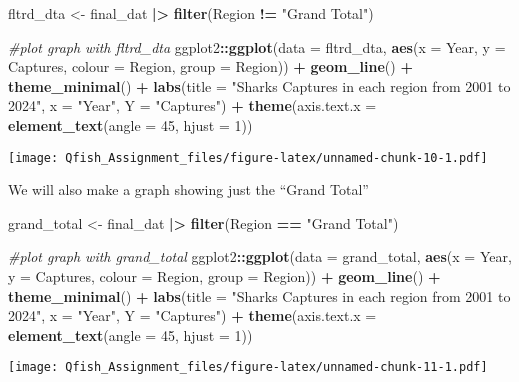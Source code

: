 \documentclass[
]{article}
\newenvironment{Shaded}{\begin{snugshade}}{\end{snugshade}}
\newcommand{\AttributeTok}[1]{\textcolor[rgb]{0.13,0.29,0.53}{#1}}
\newcommand{\CommentTok}[1]{\textcolor[rgb]{0.56,0.35,0.01}{\textit{#1}}}
\newcommand{\DecValTok}[1]{\textcolor[rgb]{0.00,0.00,0.81}{#1}}
\newcommand{\FunctionTok}[1]{\textcolor[rgb]{0.13,0.29,0.53}{\textbf{#1}}}
\newcommand{\NormalTok}[1]{#1}
\newcommand{\OtherTok}[1]{\textcolor[rgb]{0.56,0.35,0.01}{#1}}
\newcommand{\SpecialCharTok}[1]{\textcolor[rgb]{0.81,0.36,0.00}{\textbf{#1}}}
\newcommand{\StringTok}[1]{\textcolor[rgb]{0.31,0.60,0.02}{#1}}
\begin{document}
\begin{Shaded}
\begin{Highlighting}[]
\NormalTok{fltrd\_dta }\OtherTok{\textless{}{-}}\NormalTok{ final\_dat }\SpecialCharTok{|\textgreater{}} \FunctionTok{filter}\NormalTok{(Region }\SpecialCharTok{!=} \StringTok{"Grand Total"}\NormalTok{)}

\CommentTok{\#plot graph with fltrd\_dta}
\NormalTok{ggplot2}\SpecialCharTok{::}\FunctionTok{ggplot}\NormalTok{(}\AttributeTok{data =}\NormalTok{ fltrd\_dta, }\FunctionTok{aes}\NormalTok{(}\AttributeTok{x =}\NormalTok{ Year, }\AttributeTok{y =}\NormalTok{ Captures, }\AttributeTok{colour =}\NormalTok{ Region, }\AttributeTok{group =}\NormalTok{ Region)) }\SpecialCharTok{+}
  \FunctionTok{geom\_line}\NormalTok{() }\SpecialCharTok{+}
  \FunctionTok{theme\_minimal}\NormalTok{() }\SpecialCharTok{+}
  \FunctionTok{labs}\NormalTok{(}\AttributeTok{title =} \StringTok{"Sharks Captures in each region from 2001 to 2024"}\NormalTok{, }\AttributeTok{x =} \StringTok{"Year"}\NormalTok{, }\AttributeTok{Y =} \StringTok{"Captures"}\NormalTok{) }\SpecialCharTok{+}
  \FunctionTok{theme}\NormalTok{(}\AttributeTok{axis.text.x =} \FunctionTok{element\_text}\NormalTok{(}\AttributeTok{angle =} \DecValTok{45}\NormalTok{, }\AttributeTok{hjust =} \DecValTok{1}\NormalTok{))}
\end{Highlighting}
\end{Shaded}

\texttt{[image: Qfish\_Assignment\_files/figure-latex/unnamed-chunk-10-1.pdf]}

We will also make a graph showing just the ``Grand Total''

\begin{Shaded}
\begin{Highlighting}[]
\NormalTok{grand\_total }\OtherTok{\textless{}{-}}\NormalTok{ final\_dat }\SpecialCharTok{|\textgreater{}} \FunctionTok{filter}\NormalTok{(Region }\SpecialCharTok{==} \StringTok{"Grand Total"}\NormalTok{)}

\CommentTok{\#plot graph with grand\_total}
\NormalTok{ggplot2}\SpecialCharTok{::}\FunctionTok{ggplot}\NormalTok{(}\AttributeTok{data =}\NormalTok{ grand\_total, }\FunctionTok{aes}\NormalTok{(}\AttributeTok{x =}\NormalTok{ Year, }\AttributeTok{y =}\NormalTok{ Captures, }\AttributeTok{colour =}\NormalTok{ Region, }\AttributeTok{group =}\NormalTok{ Region)) }\SpecialCharTok{+}
  \FunctionTok{geom\_line}\NormalTok{() }\SpecialCharTok{+}
  \FunctionTok{theme\_minimal}\NormalTok{() }\SpecialCharTok{+}
  \FunctionTok{labs}\NormalTok{(}\AttributeTok{title =} \StringTok{"Sharks Captures in each region from 2001 to 2024"}\NormalTok{, }\AttributeTok{x =} \StringTok{"Year"}\NormalTok{, }\AttributeTok{Y =} \StringTok{"Captures"}\NormalTok{) }\SpecialCharTok{+}
  \FunctionTok{theme}\NormalTok{(}\AttributeTok{axis.text.x =} \FunctionTok{element\_text}\NormalTok{(}\AttributeTok{angle =} \DecValTok{45}\NormalTok{, }\AttributeTok{hjust =} \DecValTok{1}\NormalTok{))}
\end{Highlighting}
\end{Shaded}

\texttt{[image: Qfish\_Assignment\_files/figure-latex/unnamed-chunk-11-1.pdf]}
\end{document}
